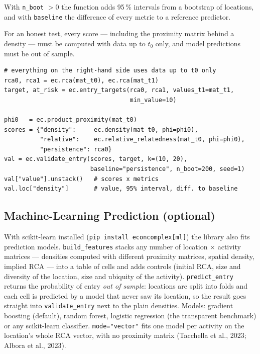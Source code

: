 \documentclass[12pt, a4paper]{article}
\newcommand{\fn}[1]{\texttt{#1}}
\begin{document}
With \texttt{n\_boot} $> 0$ the function adds 95\,\% intervals from a
bootstrap of locations, and with \texttt{baseline} the difference of
every metric to a reference predictor.

\begin{warnbox}
  For an honest test, every score --- including the proximity matrix
  behind a density --- must be computed with data up to $t_0$ only, and
  model predictions must be out of sample.
\end{warnbox}

\begin{lstlisting}[caption={Do the scores predict entry?}]
# everything on the right-hand side uses data up to t0 only
rca0, rca1 = ec.rca(mat_t0), ec.rca(mat_t1)
target, at_risk = ec.entry_targets(rca0, rca1, values_t1=mat_t1,
                                   min_value=10)

phi0   = ec.product_proximity(mat_t0)
scores = {"density":     ec.density(mat_t0, phi=phi0),
          "relative":    ec.relative_relatedness(mat_t0, phi=phi0),
          "persistence": rca0}
val = ec.validate_entry(scores, target, k=(10, 20),
                        baseline="persistence", n_boot=200, seed=1)
val["value"].unstack()   # scores x metrics
val.loc["density"]       # value, 95% interval, diff. to baseline
\end{lstlisting}

\subsection{Machine-Learning Prediction (optional)}

\begin{sloppypar}
With scikit-learn installed (\texttt{pip install econcomplex[ml]}) the
library also fits prediction models. \fn{build\_features} stacks any
number of location $\times$ activity matrices --- densities computed
with different proximity matrices, spatial density, implied RCA --- into
a table of cells and adds controls (initial RCA, size and diversity of
the location, size and ubiquity of the activity). \fn{predict\_entry}
returns the probability of entry \emph{out of sample}: locations are
split into folds and each cell is predicted by a model that never saw
its location, so the result goes straight into \fn{validate\_entry}
next to the plain densities. Models: gradient boosting (default), random
forest, logistic regression (the transparent benchmark) or any
scikit-learn classifier. \texttt{mode="vector"} fits one model per
activity on the location's whole RCA vector, with no proximity matrix
(Tacchella et al., 2023; Albora et al., 2023).
\end{sloppypar}
\end{document}
